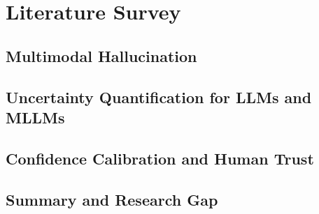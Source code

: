 \section{Literature Survey}
\label{sec:literature}


\subsection{Multimodal Hallucination}

\subsection{Uncertainty Quantification for LLMs and MLLMs}

\subsection{Confidence Calibration and Human Trust}

\subsection{Summary and Research Gap}
